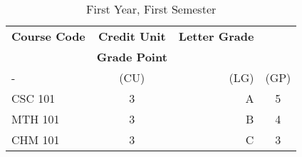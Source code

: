 \documentclass{article}
\begin{document}
	\begin{table}[h!]
		\begin{center}
			\caption{First Year, First Semester}
			\label{tab:table1}
			\begin{tabular}{l|c|r|c}
				\textbf{Course Code} & \textbf{Credit Unit} &
				\textbf{Letter  Grade}\\ & \textbf{Grade Point}\\
				- & (CU) & (LG) & (GP) \\
				\hline
				CSC 101 & 3 & A & 5\\
				MTH 101 & 3 & B & 4\\
				CHM 101 & 3 & C & 3\\
			\end{tabular}
		\end{center}
	\end{table}
\end{document}
